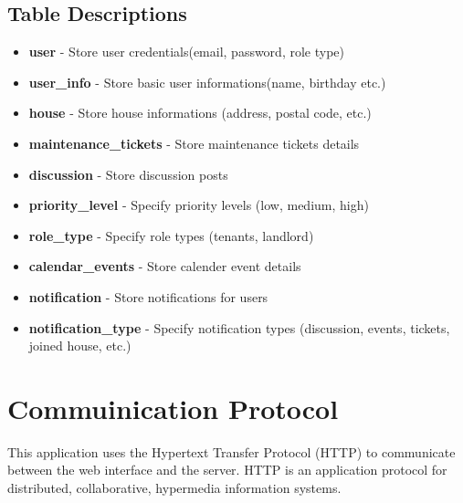 \documentclass[12pt]{article}
\begin{document}
\subsection{Table Descriptions}
\begin{itemize}
    \item \textbf{user} - Store user credentials(email, password, role type)
    \item \textbf{user\_info} - Store basic user informations(name, birthday etc.)
    \item \textbf{house} - Store house informations (address, postal code, etc.)
    \item \textbf{maintenance\_tickets} - Store maintenance tickets details
    \item \textbf{discussion} - Store discussion posts
    \item \textbf{priority\_level} - Specify priority levels (low, medium, high)
    \item \textbf{role\_type} - Specify role types (tenants, landlord)
    \item \textbf{calendar\_events} - Store calender event details
    \item \textbf{notification} - Store notifications for users
    \item \textbf{notification\_type} - Specify notification types (discussion, events, tickets, joined house, etc.)

\end{itemize}

%
\section{Commuinication Protocol}
This application uses the Hypertext Transfer Protocol (HTTP) to communicate between the web interface and the server. HTTP is an application protocol for distributed, collaborative, hypermedia information systems.

%
\end{document}
